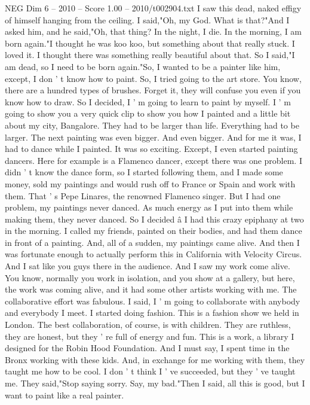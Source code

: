 \begin{textsample}{NEG Dim 6 – 2010 – Score 1.00 – 2010/t002904.txt}
I saw this dead, naked effigy of himself hanging from the ceiling.
I said,"Oh, my God.
What is that?"And I asked him, and he said,"Oh, that thing?
In the night, I die.
In the morning, I am born again."I thought he was koo koo, but something about that really stuck.
I loved it.
I thought there was something really beautiful about that.
So I said,"I am dead, so I need to be born again."So, I wanted to be a painter like him, except, I don ' t know how to paint.
So, I tried going to the art store.
You know, there are a hundred types of brushes.
Forget it, they will confuse you even if you know how to draw.
So I decided, I ' m going to learn to paint by myself.
I ' m going to show you a very quick clip to show you how I painted and a little bit about my city, Bangalore.
They had to be larger than life.
Everything had to be larger.
The next painting was even bigger.
And even bigger.
And for me it was, I had to dance while I painted.
It was so exciting.
Except, I even started painting dancers.
Here for example is a Flamenco dancer, except there was one problem.
I didn ' t know the dance form, so I started following them, and I made some money, sold my paintings and would rush off to France or Spain and work with them.
That ' s Pepe Linares, the renowned Flamenco singer.
But I had one problem, my paintings never danced.
As much energy as I put into them while making them, they never danced.
So I decided â I had this crazy epiphany at two in the morning.
I called my friends, painted on their bodies, and had them dance in front of a painting.
And, all of a sudden, my paintings came alive.
And then I was fortunate enough to actually perform this in California with Velocity Circus.
And I sat like you guys there in the audience.
And I saw my work come alive.
You know, normally you work in isolation, and you show at a gallery, but here, the work was coming alive, and it had some other artists working with me.
The collaborative effort was fabulous.
I said, I ' m going to collaborate with anybody and everybody I meet.
I started doing fashion.
This is a fashion show we held in London.
The best collaboration, of course, is with children.
They are ruthless, they are honest, but they ' re full of energy and fun.
This is a work, a library I designed for the Robin Hood Foundation.
And I must say, I spent time in the Bronx working with these kids.
And, in exchange for me working with them, they taught me how to be cool.
I don ' t think I ' ve succeeded, but they ' ve taught me.
They said,"Stop saying sorry.
Say, my bad."Then I said, all this is good, but I want to paint like a real painter.

\end{textsample}
